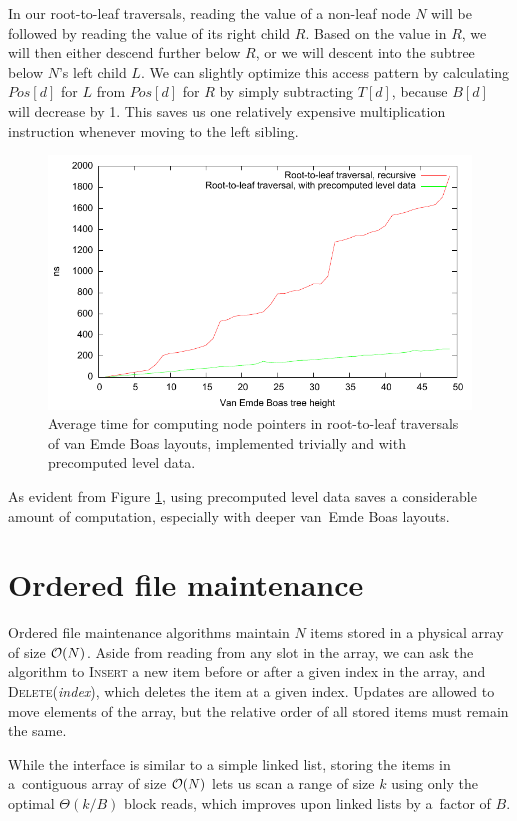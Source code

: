 In our root-to-leaf traversals, reading the value of a non-leaf node $N$ will be
followed by reading the value of its right child $R$. Based on the value in
$R$, we will then either descend further below $R$, or we will descent into
the subtree below $N$'s left child $L$.
We can slightly optimize this access pattern by calculating $Pos[d]$ for $L$
from $Pos[d]$ for $R$ by simply subtracting $T[d]$, because $B[d]$ will
decrease by 1. This saves us one relatively expensive multiplication
instruction whenever moving to the left sibling.

\begin{figure}
\centering
\includegraphics{img/veb-drilldown-speed}
\caption{Average time for computing node pointers in root-to-leaf traversals
	of van Emde Boas layouts, implemented trivially and with precomputed
	level data.}
\label{fig:veb_drilldown_speed}
\end{figure}
As evident from Figure \ref{fig:veb_drilldown_speed}, using precomputed level
data saves a considerable amount of computation, especially with deeper
van~Emde Boas layouts.

\section{Ordered file maintenance}
Ordered file maintenance algorithms maintain $N$ items stored in a physical
array of size $\mathcal{O}(N)$. Aside from reading from any slot in the array,
we can ask the algorithm to \textsc{Insert} a new item before or after
a given index in the array, and \textsc{Delete}(\emph{index}), which deletes
the item at a given index. Updates are allowed to move elements of the array,
but the relative order of all stored items must remain the same.

While the interface is similar to a simple linked list, storing the items
in a~contiguous array of size $\mathcal{O}(N)$ lets us scan a range of size $k$ using
only the optimal $\Theta(k/B)$ block reads, which improves upon linked lists
by a~factor of $B$.

